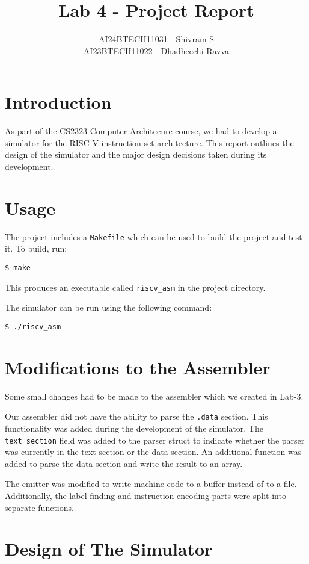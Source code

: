 \documentclass{article}
\title{Lab 4 - Project Report}
\author{AI24BTECH11031 - Shivram S\\
AI23BTECH11022 - Dhadheechi Ravva}
\date{}
\begin{document}
\maketitle
\tableofcontents
\pagebreak

\section{Introduction}

As part of the CS2323 Computer Architecure course, we had to develop a simulator
for the RISC-V instruction set architecture. This report outlines the design of the 
simulator and the major design decisions taken during its development.

\section{Usage}

The project includes a \texttt{Makefile} which can be used to build the project and
test it. To build, run:
\begin{verbatim}
$ make
\end{verbatim} 
This produces an executable called \texttt{riscv\_asm} in the project directory.

The simulator can be run using the following command:
\begin{verbatim}
$ ./riscv_asm
\end{verbatim}

\section{Modifications to the Assembler}

Some small changes had to be made to the assembler which we created in Lab-3.

Our assembler did not have the ability to parse the \texttt{.data} section.
This functionality was added during the development of the simulator. The
\texttt{text\_section} field was added to the parser struct to indicate whether
the parser was currently in the text section or the data section. An additional
function was added to parse the data section and write the result to an array.

The emitter was modified to write machine code to a buffer instead of to a file.
Additionally, the label finding and instruction encoding parts were split into
separate functions.

\section{Design of The Simulator}
\end{document}
